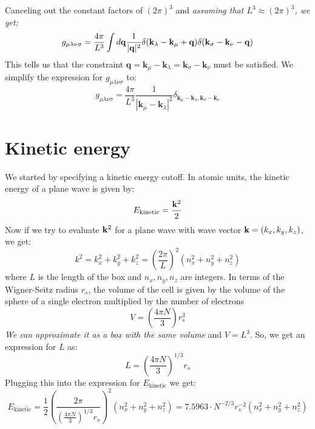 \documentclass[12pt]{article}
\begin{document}
Canceling out the constant factors of $(2\pi)^3$ and \emph{assuming that $L^3 \approx (2\pi)^3$, we get:}
\begin{equation}
    g_{\mu\lambda\nu\sigma} = \frac{4\pi}{L^3} \int d\mathbf{q} \frac{1}{|\vb{q}|^2} \delta(\mathbf{k}_\lambda - \mathbf{k}_\mu + \mathbf{q}) \delta(\mathbf{k}_\sigma - \mathbf{k}_\nu - \mathbf{q})
\end{equation}
This tells us that the constraint $\mathbf{q} = \mathbf{k}_\mu - \mathbf{k}_\lambda = \mathbf{k}_\sigma - \mathbf{k}_\nu$ must be satisfied. We simplify the expression for $g_{\mu\lambda\nu\sigma}$ to:
\begin{equation}
    g_{\mu\lambda\nu\sigma} = \frac{4\pi}{L^3} \frac{1}{|\mathbf{k}_\mu - \mathbf{k}_\lambda|^2} \delta_{\mathbf{k}_\mu - \mathbf{k}_\lambda, \mathbf{k}_\sigma - \mathbf{k}_\nu}
\end{equation}


\section{Kinetic energy}

We started by specifying a kinetic energy cutoff. In atomic units, the kinetic energy of a plane wave is given by:
\begin{equation}
    E_{\text{kinetic}} = \frac{\vb{k}^2}{2}
\end{equation}
Now if we try to evaluate $\vb{k}^2$ for a plane wave with wave vector $\vb{k} = (k_x, k_y, k_z)$, we get:
\begin{equation}
    k^2 = k_x^2 + k_y^2 + k_z^2 =  \left(\frac{2\pi}{L}\right)^2 \left(n_x^2 + n_y^2 + n_z^2\right)
\end{equation}
where $L$ is the length of the box and $n_x, n_y, n_z$ are integers. In terms of the Wigner-Seitz radius $r_s$, the volume of the cell is given by the volume of the sphere of a single electron multiplied by the number of electrons
\begin{equation}
    V = \left(\frac{4\pi N}{3}\right) r_s^3
\end{equation}
\emph{We can approximate it as a box with the same volume} and $V= L^3$. So, we get an expression for $L$ as:
\begin{equation}
    L = \left( \frac{4\pi N}{3} \right)^{1/3} r_s
\end{equation}
Plugging this into the expression for $E_{\text{kinetic}}$ we get:
\begin{equation}
    E_{\text{kinetic}} = \frac{1}{2}\left(\frac{2 \pi}{\left( \frac{4\pi N}{3} \right)^{1/3} r_s}\right)^2 \left(n_x^2 + n_y^2 + n_z^2\right) = 7.5963 \cdot N^{-2/3} r_s^{-2} \left(n_x^2 + n_y^2 + n_z^2\right)
\end{equation}
\end{document}
